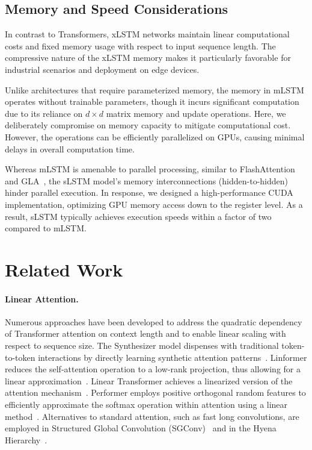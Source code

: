 \subsection{Memory and Speed Considerations}

In contrast to Transformers, xLSTM networks maintain linear computational costs and fixed memory usage with respect to input sequence length. The compressive nature of the xLSTM memory makes it particularly favorable for industrial scenarios and deployment on edge devices.

Unlike architectures that require parameterized memory, the memory in mLSTM operates without trainable parameters, though it incurs significant computation due to its reliance on $d \times d$ matrix memory and update operations. Here, we deliberately compromise on memory capacity to mitigate computational cost. However, the operations can be efficiently parallelized on GPUs, causing minimal delays in overall computation time.

Whereas mLSTM is amenable to parallel processing, similar to FlashAttention~\citep{Dao:22,Dao:23} and GLA~\citep{Yang:23arxiv}, the sLSTM model's memory interconnections (hidden-to-hidden) hinder parallel execution. In response, we designed a high-performance CUDA implementation, optimizing GPU memory access down to the register level. As a result, sLSTM typically achieves execution speeds within a factor of two compared to mLSTM.

\section{Related Work}
\label{sec:related}

\paragraph{Linear Attention.} Numerous approaches have been developed to address the quadratic dependency of Transformer attention on context length and to enable linear scaling with respect to sequence size. The Synthesizer model dispenses with traditional token-to-token interactions by directly learning synthetic attention patterns~\citep{Tay:20arxiv}. Linformer reduces the self-attention operation to a low-rank projection, thus allowing for a linear approximation~\citep{Wang:20arxiv}. Linear Transformer achieves a linearized version of the attention mechanism~\citep{Katharopoulos:20}. Performer employs positive orthogonal random features to efficiently approximate the softmax operation within attention using a linear method~\citep{Choromanski:21}. Alternatives to standard attention, such as fast long convolutions, are employed in Structured Global Convolution (SGConv)~\citep{Li:22} and in the Hyena Hierarchy~\citep{Poli:23}.

